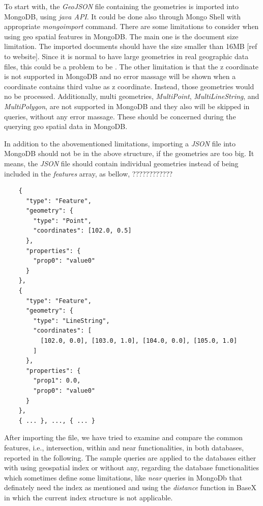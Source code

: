 \documentclass[a4paper,12pt]{article}
\begin{document}
To start with, the \textit{GeoJSON} file containing the geometries is imported into MongoDB, using \textit{java API}. It could be done also through Mongo Shell with appropriate \textit{mongoimport} command. There are some limitations to consider when using geo spatial features in MongoDB. The main one is the document size limitation. The imported documents should have the size smaller than 16MB [ref to website]. Since it is normal to have large geometries in real geographic data files, this could be a problem to be . The other limitation is that the z coordinate is not supported in MongoDB and no error massage will be shown when a coordinate contains third value as z coordinate. Instead, those geometries would no be processed. Additionally, multi geometries, \textit{MultiPoint}, \textit{MultiLineString}, and \textit{MultiPolygon}, are not supported in MongoDB and they also will be skipped in queries, without any error massage. These should be concerned during the querying geo spatial data in MongoDB.

In addition to the abovementioned limitations, importing a \textit{JSON} file into MongoDB should not be in the above structure, if the geometries are too big. It means, the \textit{JSON} file should contain individual geometries instead of being included in the \textit{features} array, as bellow, ????????????
 
\begin{verbatim}
    {
      "type": "Feature",
      "geometry": {
        "type": "Point",
        "coordinates": [102.0, 0.5]
      },
      "properties": {
        "prop0": "value0"
      }
    },
    {
      "type": "Feature",
      "geometry": {
        "type": "LineString",
        "coordinates": [
          [102.0, 0.0], [103.0, 1.0], [104.0, 0.0], [105.0, 1.0]
        ]
      },
      "properties": {
        "prop1": 0.0,
        "prop0": "value0"
      }
    }, 
    { ... }, ..., { ... }
\end{verbatim}

After importing the file, we have tried to examine and compare the common features, i.e., intersection, within and near functionalities, in both databases, reported in the following.
The sample queries are applied to the databases either with using geospatial index or without any, regarding the database functionalities which sometimes define some limitations, like \textit{near} queries in MongoDb that definately need the index as mentioned and using the \textit{distance} function in BaseX in which the current index structure is not applicable.
 
\end{document}

